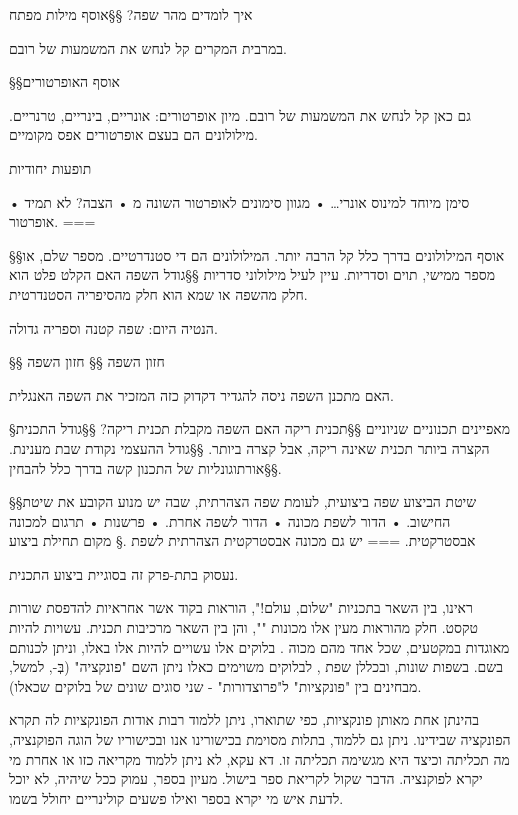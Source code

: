 איך לומדים מהר שפה?
§§אוסף מילות מפתח

במרבית המקרים קל לנחש את המשמעות של רובם.

§§אוסף האופרטורים

גם כאן קל לנחש את המשמעות של רובם.
מיון אופרטורים: אונריים, בינריים, טרנריים.
מילולונים הם בעצם אופרטורים אפס מקומיים.

תופעות יחודיות

• סימן מיוחד למינוס אונרי…
• מגוון סימונים לאופרטור השונה מ
• הצבה? לא תמיד אופרטור.
===

§§אוסף המילולונים
בדרך כלל קל הרבה יותר. המילולונים הם די סטנדרטיים.
מספר שלם, או מספר ממישי, תוים וסדריות.
עיין לעיל מילולוני סדריות
§§גודל השפה
האם הקלט פלט הוא חלק מהשפה או שמא הוא חלק מהסיפריה הסטנדרטית.

הנטיה היום: שפה קטנה וספריה גדולה.

§§ חזון השפה
§§ חזון השפה

האם מתכנן השפה ניסה להגדיר דקדוק כזה המזכיר את השפה האנגלית.

§מאפיינים תכנוניים שניוניים
§§תכנית ריקה
האם השפה מקבלת תכנית ריקה?
§§גודל התכנית הקצרה ביותר
תכנית שאינה ריקה, אבל קצרה ביותר.
§§גודל ה העצמי
נקודת שבת מענינת.
§§אורתוגונליות של התכנון
קשה בדרך כלל להבחין.

§§שיטת הביצוע
שפה ביצועית, לעומת שפה הצהרתית, שבה יש מנוע הקובע את שיטת החישוב.
• הדור לשפת מכונה
• הדור לשפה אחרת.
• פרשנות
• תרגום למכונה אבסטרקטית.
===
יש גם מכונה אבסטרקטית הצהרתית לשפת .§ מקום תחילת ביצוע

נעסוק בתת-פרק זה בסוגיית 
ביצוע התכנית.

ראינו, בין השאר בתכניות "שלום, עולם!", הוראות בקוד אשר אחראיות להדפסת שורות
טקסט. חלק מהוראות מעין אלו מכונות "", והן בין השאר מרכיבות תכנית.
 עשויות להיות מאוגדות במקטעים, שכל אחד מהם מכוה . בלוקים אלו
עשויים להיות  אלו באלו, וניתן לכנותם בשם. בשפות שונות,
ובכללן שפת , לבלוקים משוימים כאלו ניתן השם "פונקציה" (בְּ-, למשל,
מבחינים בין "פונקציות" ל"פרוצדורות" - שני סוגים שונים של בלוקים שכאלו).

בהינתן אחת מאותן פונקציות, כפי שתוארו, ניתן ללמוד רבות אודות הפונקציות לה תקרא
הפונקציה שבידינו. ניתן גם ללמוד, בתלות מסוימת בכישורינו אנו ובכישוריו של הוגה
הפוקנציה, מה תכליתה וכיצד היא מגשימה תכליתה זו. דא עקא, לא ניתן ללמוד מקריאה
כזו או אחרת מי יקרא לפוקנציה. הדבר שקול לקריאת ספר בישול. מעיון בספר, עמוק ככל
שיהיה, לא יוכל לדעת איש מי יקרא בספר ואילו פשעים קולינריים יחולל בשמו.


